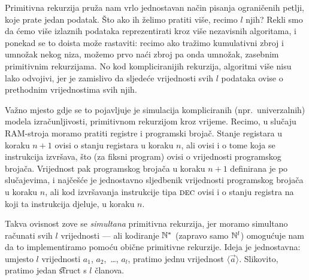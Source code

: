 Primitivna rekurzija pruža nam vrlo jednostavan način pisanja ograničenih petlji, koje prate jedan podatak. Što ako ih želimo pratiti više, recimo $l$ njih? Rekli smo da ćemo više izlaznih podataka reprezentirati kroz više nezavisnih algoritama, i ponekad se to doista može rastaviti: recimo ako tražimo kumulativni zbroj i umnožak nekog niza, možemo prvo naći zbroj pa onda umnožak, zasebnim primitivnim rekurzijama. No kod kompliciranijih rekurzija, algoritmi više nisu lako odvojivi, jer je zamislivo da sljedeće vrijednosti svih $l$ podataka ovise o prethodnim vrijednostima svih njih.

Važno mjesto gdje se to pojavljuje je simulacija kompliciranih (npr.\ univerzalnih) modela izračunljivosti, primitivnom rekurzijom kroz vrijeme. Recimo, u slučaju RAM-stroja moramo pratiti registre i programski brojač. Stanje registara u koraku $n+1$ ovisi o stanju registara u koraku $n$, ali ovisi i o tome koja se instrukcija izvršava, što (za fiksni program) ovisi o vrijednosti programskog brojača. Vrijednost pak programskog brojača u koraku $n+1$ definirana je po slučajevima, i najčešće je jednostavno sljedbenik vrijednosti programskog brojača u koraku $n$, ali kod izvršavanja instrukcije tipa $\textsc{dec}$ ovisi i o stanju registra na koji ta instrukcija djeluje, u koraku $n$.

Takva ovisnost zove se \emph{simultana} primitivna rekurzija, jer moramo simultano ra\-ču\-na\-ti svih $l$ vrijednosti --- ali kodiranje ${\mathbb N}^*$ (zapravo samo ${\mathbb N}^l$) omogućuje nam da to implementiramo pomoću obične primitivne rekurzije. Ideja je jednostavna: umjesto $l$ vrijednosti $a_1$, $a_2$,~\ldots, $a_l$, pratimo jednu vrijednost $\langle\vec a\rangle$. Slikovito, pratimo jedan \t{struct} s $l$ članova.

